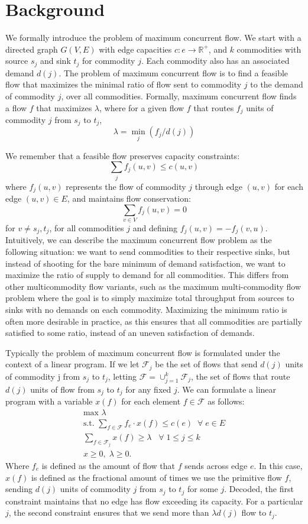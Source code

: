 \section{Background}
We formally introduce the problem of maximum concurrent flow. We
start with a directed graph $G(V,E)$ with edge capacities 
$c: e \rightarrow \mathbb{R}^+$,
 and $k$ commodities with source $s_j$ and sink $t_j$ for
commodity $j$. Each commodity also has an associated demand
$d(j)$. The problem of maximum concurrent flow is to find a feasible
flow that maximizes the minimal ratio of flow sent to commodity $j$ to the
demand of commodity $j$, over all commodities. Formally, maximum
concurrent flow finds a flow $f$ that maximizes $\lambda$, where for a given flow $f$ that routes $f_j$
units of commodity $j$ from $s_j$ to $t_j$, 
$$\lambda = \min_{j}(f_j/d(j))$$

We remember that a feasible flow preserves capacity constraints: 
$$\sum_j f_j(u,v) \leq c(u,v)$$
where $f_j(u,v)$ represents the flow of commodity $j$ through edge
$(u,v)$ for each edge $(u,v)\in E$, and maintains flow conservation:
$$\sum_{v\in V} f_j(u,v)=0$$ 
for $v\neq s_j,t_j$, for all commodities $j$ and defining
$f_j(u,v)=-f_j(v,u)$. Intuitively, we can describe the maximum
concurrent flow problem as the following situation: we want to send
commodities to their respective sinks, but instead of shooting for the
bare minimum of demand satisfaction, we want to maximize the ratio of
supply to demand for all commodities. This differs from other
multicommodity flow variants, such as the maximum multi-commodity flow
problem where the goal is to simply maximize total throughput from
sources to sinks with no demands on each commodity. Maximizing the minimum ratio is often more desirable in practice,
as this ensures that all commodities are partially satisfied to some ratio, instead of an uneven satisfaction of demands.

Typically the problem of maximum concurrent flow is formulated under the context of a linear
program. If we let $\mathcal{F}_j$ be the set of flows that send $d(j)$ units
of commodity j from $s_j$ to $t_j$, letting
 $\mathcal{F}=\cup_{j=1}^k \mathcal{F}_j$, the set of flows that route
$d(j)$ units of flow from $s_j$ to $t_j$ for any fixed $j$. We can
formulate a linear program with a variable $x(f)$ for each element
$f\in \mathcal{F}$ as follows:
\begin{align*}
\text{max     } \lambda \\
\text{s.t. }\sum_{f\in \mathcal{F}}f_e\cdot x(f) \leq c(e) \;\;\forall\;
e\in E \\
\sum_{f\in \mathcal{F}_j} x(f)\geq \lambda \;\;\;\forall\; 1\leq j\leq k \\
x\geq 0,\; \lambda\geq 0.
\end{align*}
Where $f_e$ is defined as the amount of flow that $f$ sends across edge $e$. In this case, $x(f)$ is defined as the fractional amount of times we use the
primitive flow $f$, sending $d(j)$ units of commodity $j$ from $s_j$
to $t_j$ for some $j$. Decoded, the first constraint maintains that no
edge has flow exceeding its capacity. For a particular $j$, the second
constraint ensures that we send more than $\lambda d(j)$ flow to
$t_j$. 

